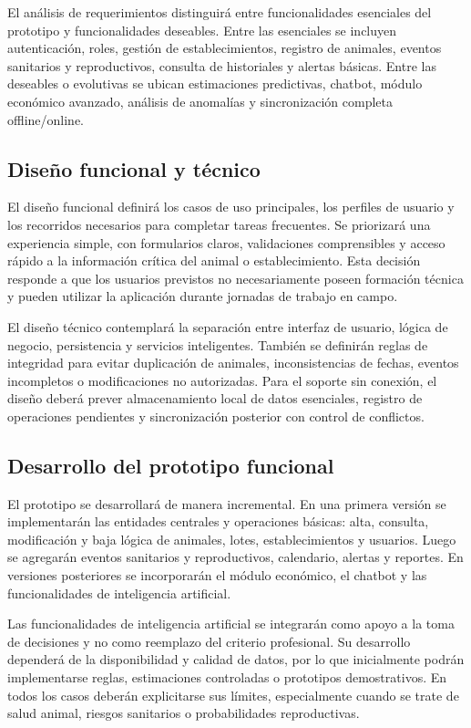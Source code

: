 El an\'alisis de requerimientos distinguir\'a entre funcionalidades esenciales del prototipo y funcionalidades deseables. Entre las esenciales se incluyen autenticaci\'on, roles, gesti\'on de establecimientos, registro de animales, eventos sanitarios y reproductivos, consulta de historiales y alertas b\'asicas. Entre las deseables o evolutivas se ubican estimaciones predictivas, chatbot, m\'odulo econ\'omico avanzado, an\'alisis de anomal\'ias y sincronizaci\'on completa offline/online.

\subsection{Dise\~no funcional y t\'ecnico}

El dise\~no funcional definir\'a los casos de uso principales, los perfiles de usuario y los recorridos necesarios para completar tareas frecuentes. Se priorizar\'a una experiencia simple, con formularios claros, validaciones comprensibles y acceso r\'apido a la informaci\'on cr\'itica del animal o establecimiento. Esta decisi\'on responde a que los usuarios previstos no necesariamente poseen formaci\'on t\'ecnica y pueden utilizar la aplicaci\'on durante jornadas de trabajo en campo.

El dise\~no t\'ecnico contemplar\'a la separaci\'on entre interfaz de usuario, l\'ogica de negocio, persistencia y servicios inteligentes. Tambi\'en se definir\'an reglas de integridad para evitar duplicaci\'on de animales, inconsistencias de fechas, eventos incompletos o modificaciones no autorizadas. Para el soporte sin conexi\'on, el dise\~no deber\'a prever almacenamiento local de datos esenciales, registro de operaciones pendientes y sincronizaci\'on posterior con control de conflictos.

\subsection{Desarrollo del prototipo funcional}

El prototipo se desarrollar\'a de manera incremental. En una primera versi\'on se implementar\'an las entidades centrales y operaciones b\'asicas: alta, consulta, modificaci\'on y baja l\'ogica de animales, lotes, establecimientos y usuarios. Luego se agregar\'an eventos sanitarios y reproductivos, calendario, alertas y reportes. En versiones posteriores se incorporar\'an el m\'odulo econ\'omico, el chatbot y las funcionalidades de inteligencia artificial.

Las funcionalidades de inteligencia artificial se integrar\'an como apoyo a la toma de decisiones y no como reemplazo del criterio profesional. Su desarrollo depender\'a de la disponibilidad y calidad de datos, por lo que inicialmente podr\'an implementarse reglas, estimaciones controladas o prototipos demostrativos. En todos los casos deber\'an explicitarse sus l\'imites, especialmente cuando se trate de salud animal, riesgos sanitarios o probabilidades reproductivas.

